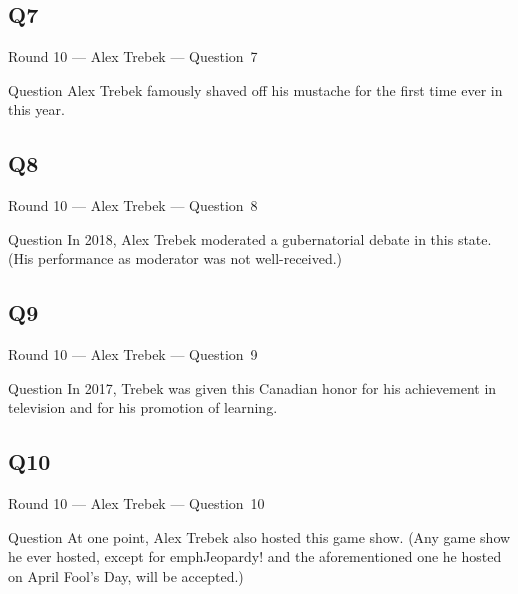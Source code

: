 \documentclass[11pt]{beamer}
\begin{document}
\subsection*{Q7}
\begin{frame}[t]{Round 10 --- Alex Trebek --- \mbox{Question 7}}
\vspace{-0.5em}
\begin{block}{Question}
Alex Trebek famously shaved off his mustache for the first time ever in this year.
\end{block}
\end{frame}
\subsection*{Q8}
\begin{frame}[t]{Round 10 --- Alex Trebek --- \mbox{Question 8}}
\vspace{-0.5em}
\begin{block}{Question}
In 2018, Alex Trebek moderated a gubernatorial debate in this state. (His performance as moderator was not well-received.)
\end{block}
\end{frame}
\subsection*{Q9}
\begin{frame}[t]{Round 10 --- Alex Trebek --- \mbox{Question 9}}
\vspace{-0.5em}
\begin{block}{Question}
In 2017, Trebek was given this Canadian honor for his achievement in television and for his promotion of learning.
\end{block}
\end{frame}
\subsection*{Q10}
\begin{frame}[t]{Round 10 --- Alex Trebek --- \mbox{Question 10}}
\vspace{-0.5em}
\begin{block}{Question}
At one point, Alex Trebek also hosted this game show. (Any game show he ever hosted, except for  emph{Jeopardy!} and the aforementioned one he hosted on April Fool's Day, will be accepted.)
\end{block}
\end{frame}
\end{document}
